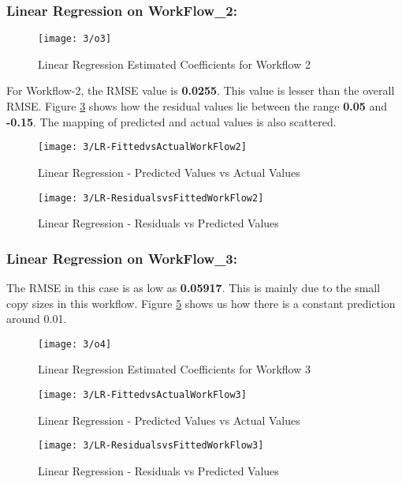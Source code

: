 \documentclass[letterpaper,twocolumn,10pt]{article}
\begin{document}
\subsubsection{Linear Regression on WorkFlow\_2:}
\begin{figure}[H]
  \texttt{[image: 3/o3]}
  \caption{Linear Regression Estimated Coefficients for Workflow 2}
  \label{fig:o3}
\end{figure}
For Workflow-2, the RMSE value is \textbf{0.0255}. This value is lesser than the overall RMSE. Figure \ref{fig:WF2ResidActual} shows how the residual values lie between the range \textbf{0.05} and \textbf{-0.15}. The mapping of predicted and actual values is also scattered.
\begin{figure}[H]
  \texttt{[image: 3/LR-FittedvsActualWorkFlow2]}
  \caption{Linear Regression - Predicted Values vs Actual Values}
  \label{fig:WF2FittedActual}
\end{figure}
\begin{figure}[H]
  \texttt{[image: 3/LR-ResidualsvsFittedWorkFlow2]}
  \caption{Linear Regression - Residuals vs Predicted Values}
  \label{fig:WF2ResidActual}
\end{figure}

\subsubsection{Linear Regression on WorkFlow\_3:}
The RMSE in this case is as low as \textbf{0.05917}. This is mainly due to the small copy sizes in this workflow. Figure \ref{fig:WF3FittedActual} shows us how there is a constant prediction around 0.01. 
\begin{figure}[H]
  \texttt{[image: 3/o4]}
  \caption{Linear Regression Estimated Coefficients for Workflow 3}
  \label{fig:o4}
\end{figure}
\begin{figure}[H]
  \texttt{[image: 3/LR-FittedvsActualWorkFlow3]}
  \caption{Linear Regression - Predicted Values vs Actual Values}
  \label{fig:WF3FittedActual}
\end{figure}
\begin{figure}[H]
  \texttt{[image: 3/LR-ResidualsvsFittedWorkFlow3]}
  \caption{Linear Regression - Residuals vs Predicted Values}
  \label{fig:WF3ResidActual}
\end{figure}
\end{document}
